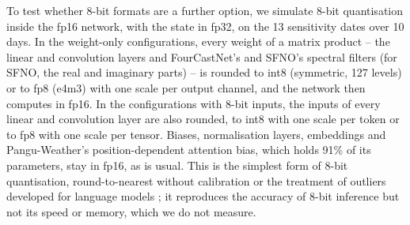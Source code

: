 To test whether 8-bit formats are a further option, we simulate
8-bit quantisation inside the fp16 network, with the state in fp32, on
the 13 sensitivity dates over 10 days. In the weight-only configurations,
every weight of a matrix product -- the linear and convolution layers and
FourCastNet's and SFNO's spectral filters (for SFNO, the real and
imaginary parts) -- is rounded to int8 (symmetric, 127 levels) or to fp8
(e4m3) with one scale per output channel, and the network then computes
in fp16. In the configurations with 8-bit inputs, the inputs of every
linear and convolution layer are also rounded, to int8 with one scale per
token or to fp8 with one scale per tensor. Biases, normalisation layers,
embeddings and Pangu-Weather's position-dependent attention bias, which
holds 91\% of its parameters, stay in fp16, as is usual. This is the
simplest form of 8-bit quantisation, round-to-nearest without
calibration or the treatment of outliers developed for language models
\citep{dettmers2022llmint8, xiao2022smoothquant, lin2023awq}; it
reproduces the accuracy of 8-bit inference but not its speed or memory,
which we do not measure.
